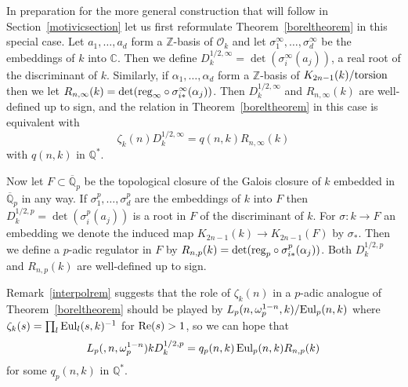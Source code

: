 \documentclass{amsart}
\begin{document}
In preparation for the more general construction that will follow
in Section~\ref{motivicsection} let us first reformulate Theorem~\ref{boreltheorem} in this special case.
Let $ a_1,\dots,a_d $ form a $ {\mathbb Z} $-basis of $ {{\mathcal O}_k} $ and let $ {\sigma}_1^\infty,\dots,{\sigma}_d^\infty $ be the embeddings of $ k $ into $ {\mathbb C} $.
Then we define $ {D_k^{1/2,\infty}} = \det({\sigma}_i^\infty(a_j)) $, a real root of the discriminant of $ k $.
Similarly, if $ {\alpha}_1,\dots,{\alpha}_d $ form a $ {\mathbb Z} $-basis of $ K_{2n-1}(k)/{\textup{torsion}} $ then we let
$ R_{n,\infty}(k) = \det({\textup{reg}}_\infty\circ{\sigma}_{i*}^\infty({\alpha}_j)) $.
Then $ {D_k^{1/2,\infty}} $ and $ R_{n,\infty}(k) $ are well-defined up to sign, and the relation in
Theorem~\ref{boreltheorem} in this case is equivalent with
\begin{equation}\label{rat}
\zeta_k(n)  D_k^{1/2,\infty} = q(n,k) R_{n,\infty}(k) 
\end{equation}
with $ q(n,k) $ in $ {\mathbb Q}^* $. 

Now let $ F \subset {{\overline {\mathbb Q}_p}} $ be the topological closure of the Galois closure of $ k $ embedded in $ {{\overline {\mathbb Q}_p}} $ in any way.
If $ {\sigma}_1^p,\dots,{\sigma}_d^p $ are the embeddings of $ k $ into $ F $ 
then $ {D_k^{1/2,p}} = \det({\sigma}_i^p(a_j)) $ is a root in $ F $ of the discriminant of $ k $.
For $ {\sigma} : k \to F $ an embedding we denote the induced map $ K_{2n-1}(k) \to K_{2n-1}(F) $ by $ {\sigma}_* $.
Then we define a {$p$-adic{\futurelet{}}} regulator in $ F $ by $  R_{n,p}(k) = \det({\textup{reg}}_p\circ{\sigma}_{i*}^p({\alpha}_j)) $.  Both
$ {D_k^{1/2,p}} $ and $ R_{n,p}(k) $ are well-defined up to sign.

Remark~\ref{interpolrem} suggests that the role of $ \zeta_k(n) $ in
a {$p$-adic{\futurelet{}}} analogue of Theorem~\ref{boreltheorem} should be played by
$ {L_{p}(n,\omega_p^{1-n},k)}/ {\textup{Eul}}_p(n,k) $ where $ {\zeta}_k(s) = \prod_l {\textup{Eul}}_l(s,k)^{-1} $ for $ {\textup{Re}}(s) > 1 $,
so we can hope that 
\[
{L_{p}(,n,\omega_p^{1-n})}k  {D_k^{1/2,p}}  = q_p(n,k) \, {\textup{Eul}}_p(n,k) R_{n,p}(k)
\]
for some $ q_p(n,k) $ in $ {\mathbb Q}^* $.
\end{document}
